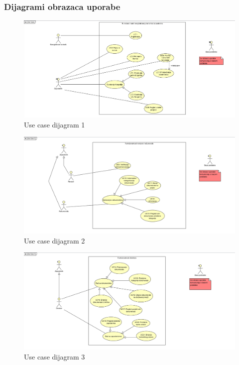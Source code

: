 					
				\subsubsection{Dijagrami obrazaca uporabe}
					
					
				\begin{figure}[H]
					\includegraphics[scale=0.5]{slike/uc.PNG} %
					\centering
					\caption{Use case dijagram 1}
					\label{fig:promjene}
				\end{figure}
				
				\begin{figure}[H]
					\includegraphics[scale=0.5]{slike/uc2.PNG} %
					\centering
					\caption{Use case dijagram 2}
					\label{fig:promjene}
				\end{figure}		
				
				\begin{figure}[H]
					\includegraphics[scale=0.5]{slike/uc3.PNG} %
					\centering
					\caption{Use case dijagram 3}
					\label{fig:promjene}
				\end{figure}
				
